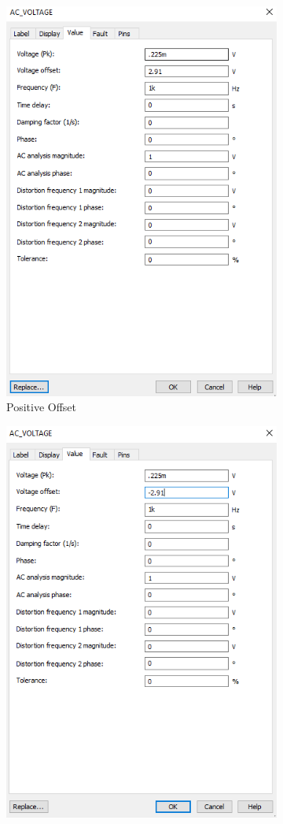\documentclass[12pt]{article}
\begin{document}
	
	\begin{figure}
		\centering
		\begin{subfigure}{.5\textwidth}
			\centering
			\includegraphics[width=.8\linewidth]{positivebias}
			\caption{Positive Offset}
			\label{fig:sub1}
		\end{subfigure}%
		\begin{subfigure}{.5\textwidth}
			\centering
			\includegraphics[width=.8\linewidth]{negativebias}

\end{subfigure}
\end{figure}
\end{document}
